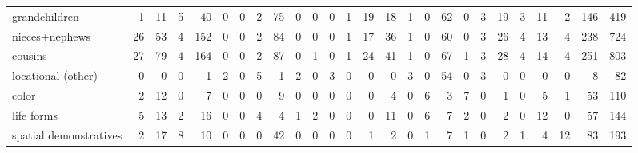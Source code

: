 \begin{table}[ht]
\begin{tabular}{lrrrrrrrrrrrrrrrrrrrrrrrrr}
  grandchildren &   1 &  11 &   5 &  40 &   0 &   0 &   2 &  75 &   0 &   0 &   0 &   1 &  19 &  18 &   1 &   0 &  62 &   0 &   3 &  19 &   3 &  11 &   2 & 146 & 419 \\ 
  nieces+nephews &  26 &  53 &   4 & 152 &   0 &   0 &   2 &  84 &   0 &   0 &   0 &   1 &  17 &  36 &   1 &   0 &  60 &   0 &   3 &  26 &   4 &  13 &   4 & 238 & 724 \\ 
  cousins &  27 &  79 &   4 & 164 &   0 &   0 &   2 &  87 &   0 &   1 &   0 &   1 &  24 &  41 &   1 &   0 &  67 &   1 &   3 &  28 &   4 &  14 &   4 & 251 & 803 \\ 
  locational (other) &   0 &   0 &   0 &   1 &   2 &   0 &   5 &   1 &   2 &   0 &   3 &   0 &   0 &   0 &   3 &   0 &  54 &   0 &   3 &   0 &   0 &   0 &   0 &   8 &  82 \\ 
  color &   2 &  12 &   0 &   7 &   0 &   0 &   0 &   9 &   0 &   0 &   0 &   0 &   0 &   4 &   0 &   6 &   3 &   7 &   0 &   1 &   0 &   5 &   1 &  53 & 110 \\ 
  life forms &   5 &  13 &   2 &  16 &   0 &   0 &   4 &   4 &   1 &   2 &   0 &   0 &   0 &  11 &   0 &   6 &   7 &   2 &   0 &   2 &   0 &  12 &   0 &  57 & 144 \\ 
  spatial demonstratives &   2 &  17 &   8 &  10 &   0 &   0 &   0 &  42 &   0 &   0 &   0 &   0 &   1 &   2 &   0 &   1 &   7 &   1 &   0 &   2 &   1 &   4 &  12 &  83 & 193 \\ 
   \hline
\end{tabular}
\end{table}
